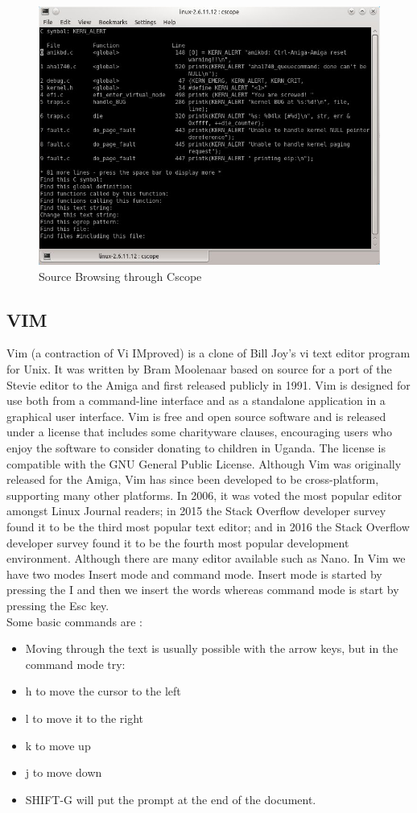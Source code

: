 \begin{figure}[ht]
	\centering
	\includegraphics[scale=0.5]{images/cscope.png}
	\caption{Source Browsing through Cscope}
\end{figure}
\subsection{VIM}
Vim (a contraction of Vi IMproved) is a clone of Bill Joy's vi text editor program for Unix. It was written by Bram Moolenaar based on source for a port of the Stevie editor to the Amiga and first released publicly in 1991. Vim is designed for use both from a command-line interface and as a standalone application in a graphical user interface. Vim is free and open source software and is released under a license that includes some charityware clauses, encouraging users who enjoy the software to consider donating to children in Uganda. The license is compatible with the GNU General Public License. Although Vim was originally released for the Amiga, Vim has since been developed to be cross-platform, supporting many other platforms. In 2006, it was voted the most popular editor amongst Linux Journal readers; in 2015 the Stack Overflow developer survey found it to be the third most popular text editor; and in 2016 the Stack Overflow developer survey found it to be the fourth most popular development environment. Although there are many editor available such as Nano. In Vim we have two modes Insert mode and command mode. Insert mode is started by pressing the I and then we insert the words whereas command mode is start by pressing the Esc key.\\
Some basic commands are :
\begin{itemize}
	\item Moving through the text is usually possible with the arrow keys, but in the command mode try:
	\item h to move the cursor to the left
	\item l to move it to the right
	\item k to move up
	\item j to move down
	\item SHIFT-G will put the prompt at the end of the document.
\end{itemize}

